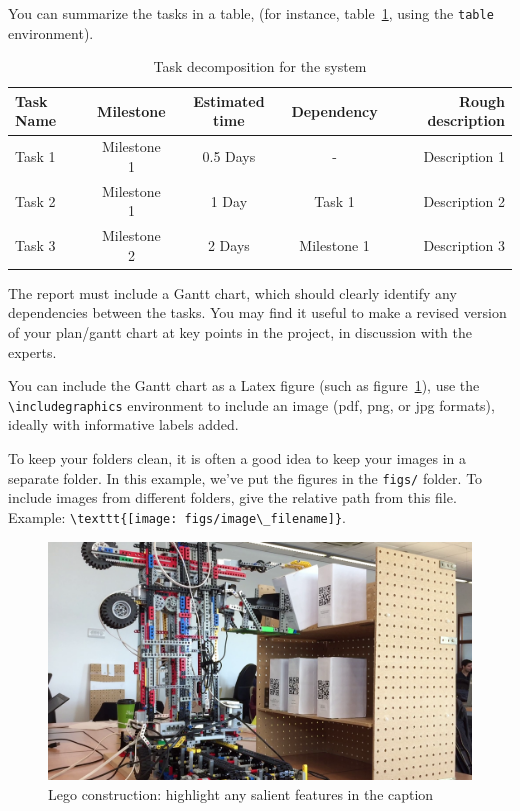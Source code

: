 \documentclass{article}
\begin{document}
You can summarize the tasks in a table, (for instance, table~\ref{tab:sample-table}, using the \verb+table+ environment).

\begin{table}[h]
\vskip 3mm
\begin{center}
\begin{small}
\begin{sc}
\begin{tabular}{lcccr}
\hline
\abovespace\belowspace
Task Name & Milestone  & Estimated time & Dependency &  Rough description \\
\hline
\abovespace
Task 1 & Milestone 1    & 0.5 Days & - & Description 1 \\
Task 2 & Milestone 1    & 1 Day  & Task 1 & Description 2 \\
Task 3 & Milestone 2    & 2 Days & Milestone 1 & Description 3 
\belowspace
\end{tabular}
\end{sc}
\end{small}
\caption{Task decomposition for the system}
\label{tab:sample-table}
\end{center}
\vskip -3mm
\end{table}

The report must include a Gantt chart, which should clearly identify any dependencies between the tasks. You may find it useful to make a revised version of your plan/gantt chart at key points in the project, in discussion with the experts. 

You can include the Gantt chart as a Latex figure (such as figure~\ref{fig:sample-fig}), use the \verb+\includegraphics+ environment to include an image (pdf, png, or jpg formats), ideally with informative labels added. 

To keep your folders clean, it is often a good idea to keep your images in a separate folder. In this example, we've put the figures in the \texttt{figs/} folder. To include images from different folders, give the relative path from this file. Example: \verb+\texttt{[image: figs/image\_filename]}+.

\begin{figure}[tb]
\vskip 5mm
\begin{center}
\centerline{\includegraphics[width=\columnwidth]{figs/crane}}
\caption{Lego construction: highlight any salient features in the caption}
\label{fig:sample-fig}
\end{center}
\vskip -5mm
\end{figure} 
\end{document}
